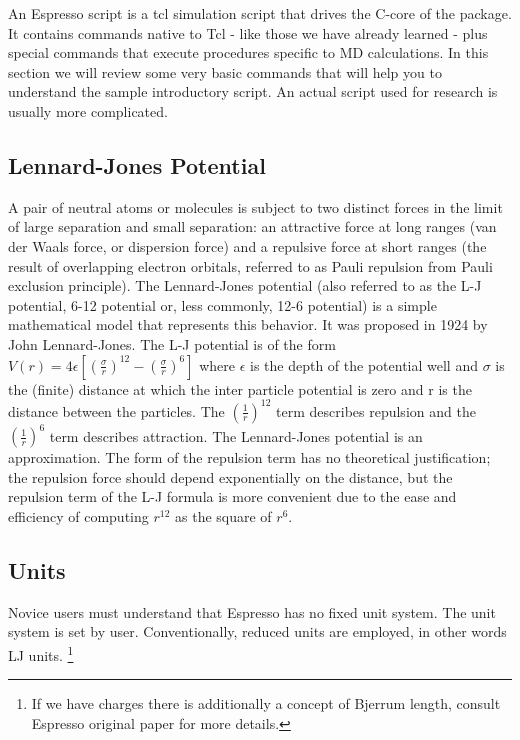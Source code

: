 \documentclass[
paper=a4,                       %
fontsize=11pt,                  %
twoside,                        %
footsepline,                    %
headsepline,                    %
headinclude=false,              %
footinclude=false,              %
pagesize,                       %
]{scrartcl}
\begin{document}
  An Espresso script is a tcl simulation script that drives 
  the C-core of the package. It contains commands native to Tcl - like those we
  have already learned - plus special \es{} commands that execute procedures
  specific to MD calculations. In this section we will review some very basic
  commands
   that will help you to understand the sample introductory script. An actual
   script used for research is usually more complicated.

\subsection{Lennard-Jones Potential}
A pair of neutral atoms or molecules is subject to two distinct forces in the limit of large separation and small separation: an attractive force at long ranges (van der Waals force, or dispersion force) and a repulsive force at short ranges (the result of overlapping electron orbitals, referred to as Pauli repulsion from Pauli exclusion principle). The Lennard-Jones potential (also referred to as the L-J potential, 6-12 potential or, less commonly, 12-6 potential) is a simple mathematical model that represents this behavior. It was proposed in 1924 by John Lennard-Jones. The L-J potential is of the form
\begin{math}
\label{eq:lj}
    V(r) = 4\epsilon [{({\frac{\sigma}{r}})}^{12} - (\frac{\sigma}{r})^{6}]
\end{math}
where $\epsilon$ is the depth of the potential well and $\sigma$ is the (finite) distance at which the inter particle potential is zero and r is the distance between the particles. The $(\frac{1}{r})^{12}$ term describes repulsion and the $(\frac{1}{r})^{6}$  term describes attraction. The Lennard-Jones potential is an approximation. The form of the repulsion term has no theoretical justification; the repulsion force should depend exponentially on the distance, but the repulsion term of the L-J formula is more convenient due to the ease and efficiency of computing $r^{12}$ as the square of $r^6$.

 \subsection{Units}
  Novice users must understand that Espresso has no fixed unit system. The unit 
  system is set by user. Conventionally, reduced units are employed, in other 
  words LJ units.
  \footnote{If we have charges there is additionally a concept of Bjerrum length, consult Espresso original paper for more details.} 
\end{document}
